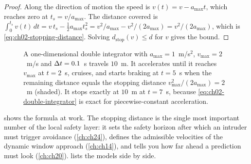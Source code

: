 \begin{proof}
Along the direction of motion the speed is $v(t)=v-a_{\max}t$, which reaches zero at $t_s=v/a_{\max}$. The distance covered is $\int_0^{t_s} v(t)\,dt = v\,t_s-\tfrac12 a_{\max}t_s^2 = v^2/a_{\max}-v^2/(2a_{\max}) = v^2/(2a_{\max})$, which is \cref{eq:ch02-stopping-distance}. Solving $d_{\text{stop}}(v)\le d$ for $v$ gives the bound. \qedhere
\end{proof}

\begin{figure}[tb]
  \centering
  \caption{A one-dimensional double integrator with $a_{\max}=1$~m/s$^2$, $v_{\max}=2$~m/s and $\Delta t=0.1$~s travels $10$~m. It accelerates until it reaches $v_{\max}$ at $t=2$~s, cruises, and starts braking at $t=5$~s when the remaining distance equals the stopping distance $v_{\max}^2/(2a_{\max})=2$~m (shaded). It stops exactly at $10$~m at $t=7$~s, because \cref{eq:ch02-double-integrator} is exact for piecewise-constant acceleration.}
  \label{fig:ch02-double-integrator}
\end{figure}

 shows the formula at work. The stopping distance is the single most important number of the local safety layer: it sets the safety horizon after which an intruder must trigger avoidance (\cref{ch:ch24}), defines the admissible velocities of the dynamic window approach (\cref{ch:ch14}), and tells you how far ahead a prediction must look (\cref{ch:ch20}).  lists the models side by side.

